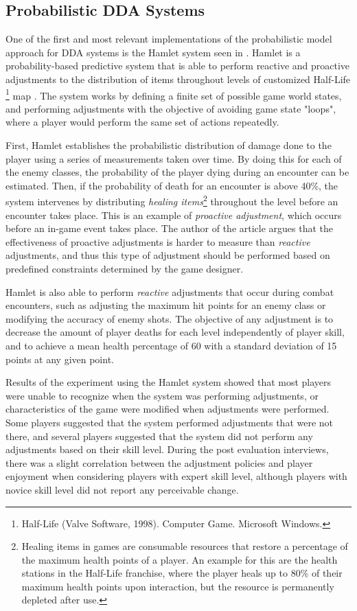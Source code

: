 \subsection{Probabilistic DDA Systems}

One of the first and most relevant implementations of the probabilistic model approach for DDA systems is the Hamlet system seen in \cite{article_casefordynamicdifficulty}. Hamlet is a probability-based predictive system that is able to perform reactive and proactive adjustments to the distribution of items throughout levels of customized Half-Life \footnote{Half-Life (Valve Software, 1998). Computer Game. Microsoft Windows.} map \cite{article_casefordynamicdifficulty}. The system works by defining a finite set of possible game world states, and performing adjustments with the objective of avoiding game state "loops", where a player would perform the same set of actions repeatedly.

First, Hamlet establishes the probabilistic distribution of damage done to the player using a series of measurements taken over time. By doing this for each of the enemy classes, the probability of the player dying during an encounter can be estimated. Then, if the probability of death for an encounter is above 40\%, the system intervenes by distributing \emph{healing items}\footnote{Healing items in games are consumable resources that restore a percentage of the maximum health points of a player. An example for this are the health stations in the Half-Life franchise, where the player heals up to 80\% of their maximum health points upon interaction, but the resource is permanently depleted after use.} throughout the level before an encounter takes place. This is an example of \emph{proactive adjustment}, which occurs before an in-game event takes place. The author of the article argues that the effectiveness of proactive adjustments is harder to measure than \emph{reactive} adjustments, and thus this type of adjustment should be performed based on predefined constraints determined by the game designer.

Hamlet is also able to perform \emph{reactive} adjustments that occur during combat encounters, such as adjusting the maximum hit points for an enemy class or modifying the accuracy of enemy shots. The objective of any adjustment is to decrease the amount of player deaths for each level independently of player skill, and to achieve a mean health percentage of 60 with a standard deviation of 15 points at any given point.

Results of the experiment using the Hamlet system showed that most players were unable to recognize when the system was performing adjustments, or characteristics of the game were modified when adjustments were performed. Some players suggested that the system performed adjustments that were not there, and several players suggested that the system did not perform any adjustments based on their skill level. During the post evaluation interviews, there was a slight correlation between the adjustment policies and player enjoyment when considering players with expert skill level, although players with novice skill level did not report any perceivable change.

